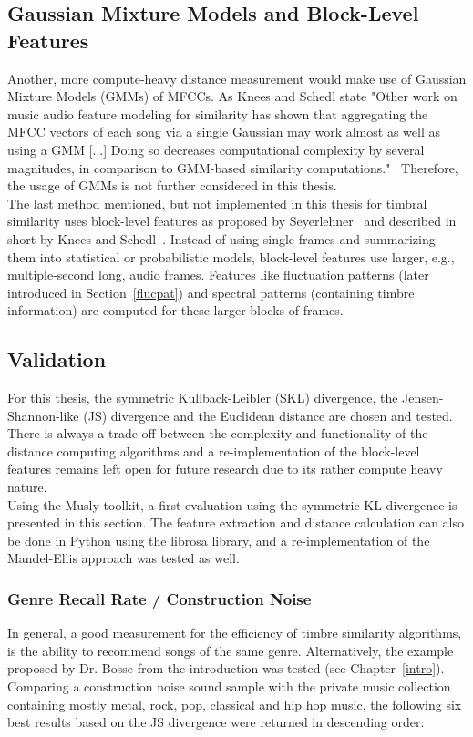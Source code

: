 \subsection{Gaussian Mixture Models and Block-Level Features}\label{blocklevel}
Another, more compute-heavy distance measurement would make use of Gaussian Mixture Models (GMMs) of MFCCs. As Knees and Schedl state "Other work on music audio feature modeling for similarity has shown that aggregating the MFCC vectors of each song via a single Gaussian may work almost as well as using a GMM [...] Doing so decreases computational complexity by several magnitudes, in comparison to GMM-based similarity computations."~\cite[p. 65]{knees1} Therefore, the usage of GMMs is not further considered in this thesis.\\
The last method mentioned, but not implemented in this thesis for timbral similarity uses block-level features as proposed by Seyerlehner~\cite{seyerlehnerblock} and described in short by Knees and Schedl~\cite[p. 67]{knees1}. Instead of using single frames and summarizing them into statistical or probabilistic models, block-level features use larger, e.g., multiple-second long, audio frames. Features like fluctuation patterns (later introduced in Section~\ref{flucpat}) and spectral patterns (containing timbre information) are computed for these larger blocks of frames. 

\subsection{Validation}

For this thesis, the symmetric Kullback-Leibler (SKL) divergence, the Jensen-Shannon-like (JS) divergence and the Euclidean distance are chosen and tested. There is always a trade-off between the complexity and functionality of the distance computing algorithms and a re-implementation of the block-level features remains left open for future research due to its rather compute heavy nature.\\
Using the Musly toolkit, a first evaluation using the symmetric KL divergence is presented in this section. The feature extraction and distance calculation can also be done in Python using the librosa library, and a re-implementation of the Mandel-Ellis approach was tested as well.\\

\subsubsection{Genre Recall Rate / Construction Noise}
In general, a good measurement for the efficiency of timbre similarity algorithms, is the ability to recommend songs of the same genre. 
Alternatively, the example proposed by Dr. Bosse from the introduction was tested (see Chapter~\ref{intro}). Comparing a construction noise sound sample with the private music collection containing mostly metal, rock, pop, classical and hip hop music, the following six best results based on the JS divergence were returned in descending order: 

